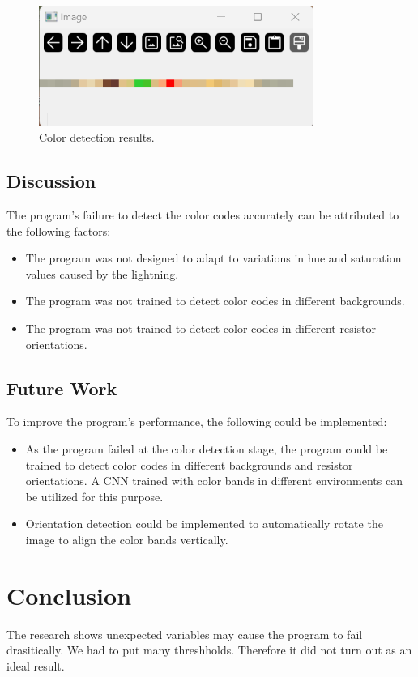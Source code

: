 \documentclass[preprint,12pt,3p,times]{elsarticle}
\begin{document}
\begin{figure}[!h]
    \centering
    \includegraphics[width=0.8\textwidth]{screen5.png}
    \caption{\label{f_color}Color detection results.}
\end{figure}

\subsection{Discussion}
The program's failure to detect the color codes accurately can be attributed to the following factors:
\begin{itemize}
    \item The program was not designed to adapt to variations in hue and saturation values caused by the lightning.
    \item The program was not trained to detect color codes in different backgrounds.
    \item The program was not trained to detect color codes in different resistor orientations.
\end{itemize}

\subsection{Future Work}
To improve the program's performance, the following could be implemented:
\begin{itemize}
    \item As the program failed at the color detection stage, the program could be trained to detect color codes in different backgrounds and resistor orientations. A CNN trained with color bands in different environments can be utilized for this purpose.
    \item Orientation detection could be implemented to automatically rotate the image to align the color bands vertically.
\end{itemize}

\section{Conclusion}\label{s5}
The research shows unexpected variables may cause the program to fail drasitically. We had to put many threshholds. Therefore it did not turn out as an ideal result.
\end{document}
